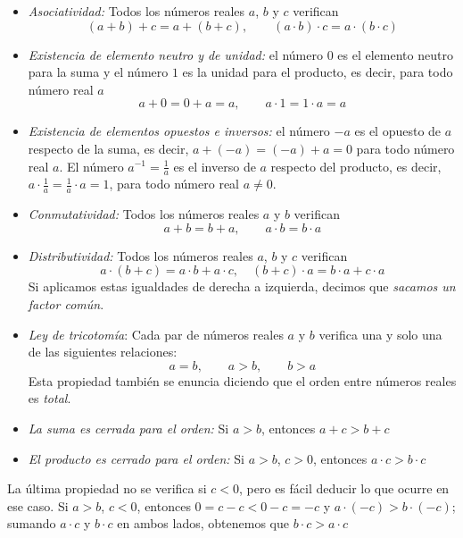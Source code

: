 \begin{itemize}
\item
\emph{Asociatividad:}
Todos los números reales $a$, $b$ y $c$ verifican
\[
(a+b)+c=a+(b+c),\qquad (a\cdot b)\cdot c=a\cdot (b\cdot c)
\]
\item
\emph{Existencia de elemento neutro y de unidad:} el número $0$ es el elemento neutro para la suma y el número $1$ es la unidad para el producto, es decir, para todo número real $a$
\[
a+0=0+a=a,\qquad
a\cdot 1=1\cdot a=a
\]
\item
\emph{Existencia de elementos opuestos e inversos:}
el número $-a$ es el opuesto de $a$ respecto de la suma, es decir,
$a+(-a)=(-a)+a=0$ para todo número real $a$.
El número $a^{-1}=\frac1a$ es el inverso de $a$ respecto del producto, es decir, $a\cdot\frac1a=\frac1a\cdot a=1$, para todo número real $a\ne 0$.
\item
\emph{Conmutatividad:}
Todos los números reales $a$ y $b$ verifican
\[
a+b=b+a,\qquad a\cdot b=b\cdot a
\]
\item
\emph{Distributividad:}
Todos los números reales $a$, $b$ y $c$ verifican
\[
a\cdot(b+c)= a\cdot b+a\cdot c,\quad
(b+c)\cdot a= b\cdot a+c\cdot a
\]
Si aplicamos estas igualdades de derecha a izquierda, decimos que \emph{sacamos un factor común}.
%
%
%
\item
\emph{Ley de tricotomía}:
Cada par de números reales $a$ y $b$ verifica una y solo una de las siguientes relaciones:
\[ a=b,\qquad {a>b},\qquad {b>a} \]
Esta propiedad también se enuncia diciendo que el orden entre números reales es \emph{total}.
\item
\emph{La suma es cerrada para el orden:}
Si $a> b$, entonces $a+c>b+c$
\item
\emph{El producto es cerrado para el orden:}
Si $a> b$, $c>0$, entonces $a\cdot c>b\cdot c$
\end{itemize}
La última propiedad no se verifica si $c<0$, pero es fácil deducir lo que ocurre en ese caso.
Si $a> b$, $c<0$, entonces $0=c-c<0-c=-c$ y $a\cdot(-c)>b\cdot(-c)$; sumando $a\cdot c$ y $b\cdot c$ en ambos lados, obtenemos que $b\cdot c >a\cdot c$


